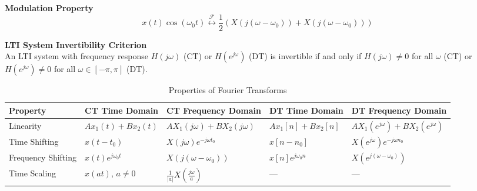 \documentclass[8pt]{article}
\begin{document}
\begin{multicols}{2}
    \noindent\textbf{Modulation Property} \\
    \begin{equation}
        x(t)\cos(\omega_0 t) \overset{\mathcal{F}}{\leftrightarrow} \frac{1}{2}\left( X(j(\omega-\omega_0)) + X(j(\omega-\omega_0))\right)
    \end{equation}

    \noindent\textbf{LTI System Invertibility Criterion} \\
    An LTI system with frequency response $H(j\omega)$ (CT) or $H(e^{j\omega})$ (DT) is
    invertible if and only if $H(j\omega) \neq 0$ for all $\omega$ (CT) or $H(e^{j\omega})
        \neq 0$ for all $\omega \in [-\pi, \pi]$ (DT).


    \newpage

    \begin{table*}[ht]
        \centering
        \caption{Properties of Fourier Transforms}
        \label{tab:fourier_transform_properties}
        \small
        \begin{tabular}{@{}lllll@{}}
            \toprule
            \textbf{Property}  & \textbf{CT Time Domain}             & \textbf{CT Frequency Domain}                                  & \textbf{DT Time Domain}            & \textbf{DT Frequency Domain}                                                                            \\
            \midrule
            Linearity          & $A x_1(t) + B x_2(t)$               & $A X_1(j\omega) + B X_2(j\omega)$                             & $A x_1[n] + B x_2[n]$              & $A X_1(e^{j\omega}) + B X_2(e^{j\omega})$                                                               \\ [1mm]
            Time Shifting      & $x(t - t_0)$                        & $X(j\omega)e^{-j\omega t_0}$                                  & $x[n - n_0]$                       & $X(e^{j\omega})e^{-j\omega n_0}$                                                                        \\ [1mm]
            Frequency Shifting & $x(t)e^{j\omega_0 t}$               & $X(j(\omega - \omega_0))$                                     & $x[n]e^{j\omega_0 n}$              & $X(e^{j(\omega - \omega_0)})$                                                                           \\ [1mm]
            Time Scaling       & $x(at)$, $a \neq 0$                 & $\frac{1}{|a|}X\left(\frac{j\omega}{a}\right)$                & ---                                & ---                                                                                                     \\ [1mm]

\end{tabular}
\end{table*}
\end{multicols}
\end{document}
